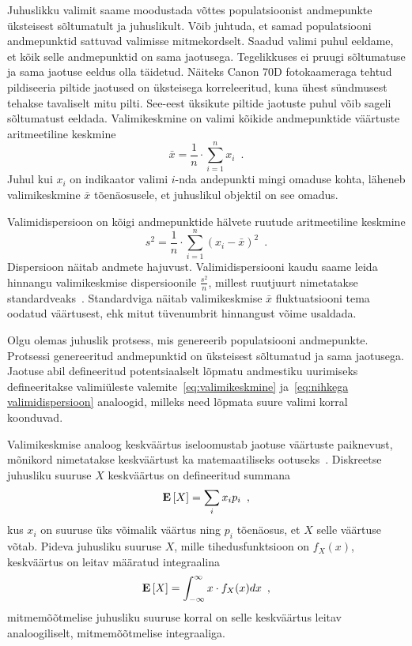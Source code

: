 Juhuslikku valimit saame moodustada võttes populatsioonist andmepunkte üksteisest sõltumatult ja juhuslikult. Võib juhtuda, et samad populatsiooni andmepunktid sattuvad valimisse mitmekordselt. Saadud valimi puhul eeldame, et kõik selle andmepunktid on sama jaotusega. Tegelikkuses ei pruugi sõltumatuse ja sama jaotuse eeldus olla täidetud. Näiteks Canon 70D fotokaameraga tehtud pildiseeria piltide jaotused on üksteisega korreleeritud, kuna ühest sündmusest tehakse tavaliselt mitu pilti. See-eest üksikute piltide jaotuste puhul võib sageli sõltumatust eeldada. Valimikeskmine on valimi kõikide andmepunktide väärtuste aritmeetiline keskmine
\begin{equation}
    \label{eq:valimikeskmine}
    \bar{x} = \frac{1}{n} \cdot \sum_{i = 1}^{n} x_i \enspace.
\end{equation}
Juhul kui $x_i$ on indikaator valimi $i$-nda andepunkti mingi omaduse kohta, läheneb valimikeskmine $\bar{x}$ tõenäosusele, et juhuslikul objektil on see omadus.

Valimidispersioon on kõigi andmepunktide hälvete ruutude aritmeetiline keskmine
\begin{equation}
    \label{eq:nihkega valimidispersioon}
    s^2 = \frac{1}{n} \cdot \sum_{i = 1}^{n} (x_i - \bar{x})^2 \enspace.
\end{equation}
Dispersioon näitab andmete hajuvust. Valimidispersiooni kaudu saame leida hinnangu valimikeskmise dispersioonile $\frac{s^2}{n}$, millest ruutjuurt nimetatakse standardveaks~\cite{rakendusstatisika-algkursus}. Standardviga näitab valimikeskmise $\bar{x}$ fluktuatsiooni tema oodatud väärtusest, ehk mitut tüvenumbrit hinnangust võime usaldada.

Olgu olemas juhuslik protsess, mis genereerib populatsiooni andmepunkte. Protsessi genereeritud andmepunktid on üksteisest sõltumatud ja sama jaotusega. Jaotuse abil defineeritud potentsiaalselt lõpmatu andmestiku uurimiseks defineeritakse valimiüleste valemite~\eqref{eq:valimikeskmine} ja~\eqref{eq:nihkega valimidispersioon} analoogid, milleks need lõpmata suure valimi korral koonduvad.

Valimikeskmise analoog keskväärtus iseloomustab jaotuse väärtuste paiknevust, mõnikord nimetatakse keskväärtust ka matemaatiliseks ootuseks~\cite{tõenäosusteooria-algkursus}. Diskreetse juhusliku suuruse $X$ keskväärtus on defineeritud summana
\begin{equation}
    \label{eq:keskväärtus}
    \operatorname*{\mathbf{E}}\left[X\right] = \sum_{i} x_i p_i \enspace,
\end{equation}
kus $x_i$ on suuruse üks võimalik väärtus ning $p_i$ tõenäosus, et $X$ selle väärtuse võtab. Pideva juhusliku suuruse $X$, mille tihedusfunktsioon on $f_X(x)$, keskväärtus on leitav määratud integraalina
\begin{equation*}
    \operatorname*{\mathbf{E}}\left[X\right] = \int_{-\infty}^{\infty} x \cdot f_X(x) dx \enspace,
\end{equation*}
mitmemõõtmelise juhusliku suuruse korral on selle keskväärtus leitav analoogiliselt, mitmemõõtmelise integraaliga.


